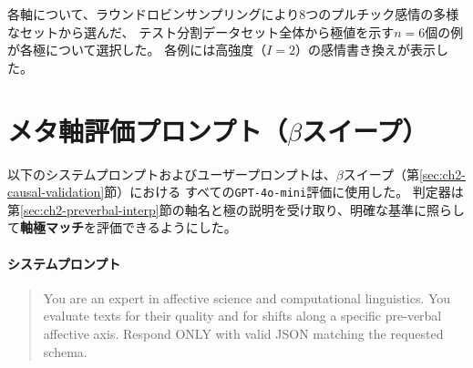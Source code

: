 各軸について、ラウンドロビンサンプリングにより8つのプルチック感情の多様なセットから選んだ、
テスト分割データセット全体から極値を示す$n=6$個の例が各極について選択した。
各例には高強度（$I=2$）の感情書き換えが表示した。

\section{メタ軸評価プロンプト（\texorpdfstring{$\beta$}{beta}スイープ）}
\label{app:eval_prompt_beta}

以下のシステムプロンプトおよびユーザープロンプトは、$\beta$スイープ（第\ref{sec:ch2-causal-validation}節）における
すべての\texttt{GPT-4o-mini}評価に使用した。
判定器は第\ref{sec:ch2-preverbal-interp}節の軸名と極の説明を受け取り、明確な基準に照らして\textbf{軸極マッチ}を評価できるようにした。

\paragraph{システムプロンプト}
\begin{quote}
\small\ttfamily
You are an expert in affective science and computational linguistics.
You evaluate texts for their quality and for shifts along a specific pre-verbal affective
axis. Respond ONLY with valid JSON matching the requested schema.
\end{quote}

